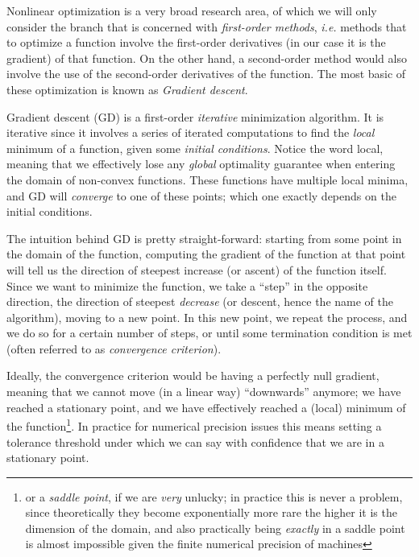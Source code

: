 
Nonlinear optimization is a very broad research area, of which we will only consider the branch that is concerned with \emph{first-order methods}, \textit{i.e.} methods that to optimize a function involve the first-order derivatives (in our case it is the gradient) of that function. On the other hand, a second-order method would also involve the use of the second-order derivatives of the function. The most basic of these optimization is known as \emph{Gradient descent}.

Gradient descent (GD) is a first-order \emph{iterative} minimization algorithm. It is iterative since it involves a series of iterated computations to find the \emph{local} minimum of a function, given some \emph{initial conditions}. Notice the word local, meaning that we effectively lose any \emph{global} optimality guarantee when entering the domain of non-convex functions. These functions have multiple local minima, and GD will \emph{converge} to one of these points; which one exactly depends on the initial conditions.

The intuition behind GD is pretty straight-forward: starting from some point in the domain of the function, computing the gradient of the function at that point will tell us the direction of steepest increase (or ascent) of the function itself. Since we want to minimize the function, we take a ``step'' in the opposite direction, the direction of steepest \textit{decrease} (or descent, hence the name of the algorithm), moving to a new point. In this new point, we repeat the process, and we do so for a certain number of steps, or until some termination condition is met (often referred to as \emph{convergence criterion}). 

\begin{samepage}
Ideally, the convergence criterion would be having a perfectly null gradient, meaning that we cannot move (in a linear way) ``downwards'' anymore; we have reached a stationary point, and we have effectively reached a (local) minimum of the function\footnote{or a \emph{saddle point}, if we are \emph{very} unlucky; in practice this is never a problem, since theoretically they become exponentially more rare the higher it is the dimension of the domain, and also practically being \emph{exactly} in a saddle point is almost impossible given the finite numerical precision of machines}. In practice for numerical precision issues this means setting a tolerance threshold under which we can say with confidence that we are in a stationary point.
\end{samepage}

